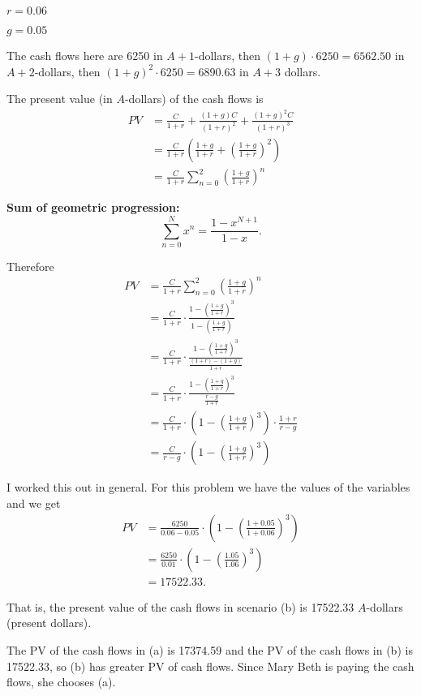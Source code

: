 \documentclass{amsart}
\begin{document}
$r=0.06$

$g=0.05$

The cash flows here are 6250 in $A+1$-dollars, then $(1+g) \cdot 6250 = 6562.50$ in
$A+2$-dollars, then $(1+g)^2 \cdot 6250=6890.63$ in $A+3$ dollars.

The present value (in $A$-dollars) of the cash flows is
\begin{align*}
PV&=\frac{C}{1+r} + \frac{(1+g)C}{(1+r)^2} + \frac{(1+g)^2 C}{(1+r)^3}\\
&= \frac{C}{1+r} \left( \frac{1+g}{1+r} + \left( \frac{1+g}{1+r} \right)^2 \right)\\
&= \frac{C}{1+r} \sum_{n=0}^2 \left(\frac{1+g}{1+r} \right)^n
\end{align*}

\textbf{Sum of geometric progression:}
\[
\sum_{n=0}^N x^n = \frac{1-x^{N+1}}{1-x}.
\]

Therefore
\begin{align*}
PV&= \frac{C}{1+r} \sum_{n=0}^2 \left(\frac{1+g}{1+r} \right)^n\\
&= \frac{C}{1+r} \cdot \frac{1- \left(\frac{1+g}{1+r} \right)^3}{1- \left(\frac{1+g}{1+r} \right)}\\
&= \frac{C}{1+r} \cdot \frac{1- \left(\frac{1+g}{1+r} \right)^3}{\frac{(1+r)-(1+g)}{1+r}}\\
&=\frac{C}{1+r} \cdot \frac{1- \left(\frac{1+g}{1+r} \right)^3}{\frac{r-g}{1+r}}\\
&= \frac{C}{1+r} \cdot \left(1- \left(\frac{1+g}{1+r} \right)^3 \right) \cdot
\frac{1+r}{r-g}\\
&=\frac{C}{r-g}\cdot \left(1- \left(\frac{1+g}{1+r} \right)^3 \right)
\end{align*}

I worked this out in general. For this problem we have the values of the
variables and we get
\begin{align*}
PV &= \frac{6250}{0.06-0.05} \cdot  \left(1- \left(\frac{1+0.05}{1+0.06} \right)^3 \right)\\
&=\frac{6250}{0.01} \cdot \left(1-\left(\frac{1.05}{1.06} \right)^3 \right)\\
&=17522.33.
\end{align*}

That is, the present value of the cash flows in scenario (b) is 
17522.33 $A$-dollars (present dollars).

The PV of the cash flows in (a) is 17374.59 and the PV of the cash flows
in (b) is 17522.33, so (b) has greater PV of cash flows. Since
Mary Beth is paying the cash flows, she chooses (a).
\end{document}
